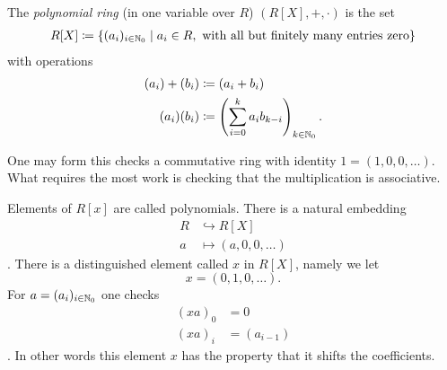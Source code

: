 \documentclass[master.tex]{subfiles}
\begin{document}
  \begin{defn}
  The \emph{polynomial ring} (in one variable over \(R\)) \((R[X],+,\cdot)\) is the set
  \begin{align*}
    R[X] \coloneqq \left\{(a_i)_{i \in {\mathbb N}_0} \mid a_i \in R, \text{ with all but finitely many entries zero}\right\}
  \end{align*}
  with operations 
  \begin{align*}
    (a_i) + (b_i) &\coloneqq (a_i + b_i)\\
    (a_i)(b_i) &\coloneqq \left(\sum_{i=0}^k a_ib_{k-i}\right)_{k \in {\mathbb N}_0}.
  \end{align*}
\end{defn}
One may form this checks a commutative ring with identity \(1=(1,0,0,\ldots)\). What requires the most work is checking
that the multiplication is associative. 
\begin{rmk*}
  Elements of \(R[x]\) are called polynomials. There is a natural embedding 
  \begin{align*}
    R &\hookrightarrow R[X]\\
    a &\mapsto (a,0,0,\ldots)
  \end{align*}.
  There is a distinguished element called \(x\) in \(R[X]\), namely we let
  \[x = (0,1,0,\ldots).\]
  For \(a=(a_i)_{i \in {\mathbb N}_0}\) one checks
  \begin{align*}
    (xa)_0 &= 0\\
    (xa)_i &= (a_{i-1})
  \end{align*}.
  In other words this element \(x\) has the property that it shifts the coefficients.
\end{rmk*}
\end{document}
